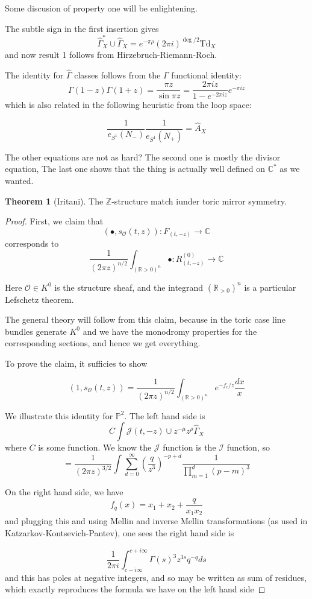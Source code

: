 \documentclass{amsart}
\theoremstyle{definition}
\newtheorem{theorem}[dummy]{Theorem}
\newcommand{\Z}{\mathbb{Z}}
\newcommand{\R}{\mathbb{R}}
\newcommand{\I}{\mathcal{I}}
\newcommand{\OO}{\mathcal{O}}
\newcommand{\proj}{\mathbb{P}}
\newcommand{\J}{\mathcal{J}}
\newcommand{\C}{\mathbb{C}}
\newcommand{\one}{1}
\begin{document}
Some discusion of property one will be enlightening.

The subtle sign in the first insertion gives 
$$\widehat{\Gamma}^*_X\cup \widehat{\Gamma}_X=e^{-\pi \rho}(2\pi i)^{\deg/2}\text{Td}_X$$
and now result 1 follows from Hirzebruch-Riemann-Roch.

The identity for $\widehat{\Gamma}$ classes follows from the
 $\Gamma$ functional identity:
$$\Gamma(1-z)\Gamma(1+z)=\frac{\pi z}{\sin \pi z}=\frac{2\pi i z}{1-e^{-2\pi i z}} e^{-\pi iz}$$
which is also related in the following heuristic from the loop space:

$$\frac{1}{e_{S^1}(N_-)}\frac{1}{e_{S^1}(N_+)}=\widehat{A}_X$$

The other equations are not as hard?  The second one is mostly the divisor equation, The last one shows that the thing is actually well defined on $\C^*$ as we wanted.


\begin{theorem}[Iritani]
The $\Z$-structure match iunder toric mirror symmetry.
\end{theorem}

\begin{proof}
First, we claim that 
$$\left(\bullet,s_\OO(t,z)\right):F_{(t,-z)}\to \C$$
corresponds to
$$\frac{1}{(2\pi z)^{n/2}}\int_{(\R>0)^n}\bullet:R^{(0)}_{(t,-z)}\to\C$$

Here $\OO\in K^0$ is the structure sheaf, and the integrand $(\R_{>0})^n$ is a particular Lefschetz theorem.

The general theory will follow from this claim, because in the toric case line bundles generate $K^0$ and we have the monodromy properties for the corresponding sections, and hence we get everything.

To prove the claim, it sufficies to show

$$\left(\one,s_\OO(t,z)\right)=\frac{1}{(2\pi z)^{n/2}}\int_{(\R>0)^n}e^{-f_c/z}\frac{dx}{x}$$

We illustrate this identity for $\proj^2$.
The left hand side is
$$C\int\J(t,-z)\cup z^{-\mu}z^\rho \widehat{\Gamma}_X$$
where $C$ is some function.  We know the $\J$ function is the $\I$ function, so
$$=\frac{1}{(2\pi z)^{3/2}}\int \sum_{d=0}^\infty \left(\frac{q}{z^3}\right)^{-p+d}\frac{1}{\prod_{m=1}^d (p-m)^3}$$

On the right hand side, we have
$$f_q(x)=x_1+x_2+\frac{q}{x_1x_2}$$
and plugging this and using Mellin and inverse Mellin transformations (as used in Katzarkov-Kontsevich-Pantev), one sees the right hand side is

$$\frac{1}{2\pi i}\int_{c-i\infty}^{c+i\infty}\Gamma(s)^3 z^{3s}q^{-q}ds$$
and this has poles at negative integers, and so may be written as sum of residues, which exactly reproduces the formula we have on the left hand side


\end{proof}
\end{document}
